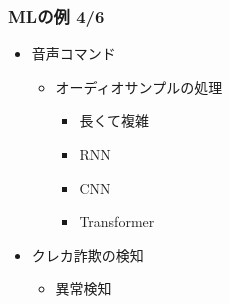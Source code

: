 \documentclass[aspectratio=169, dvipdfmx, 14pt, xcolor={svgnames,dvipsnames}]{beamer}
\def\tightlist{\itemsep1pt\parskip0pt\parsep0pt}
\begin{document}
\begin{frame}
  \frametitle{MLの例 4/6}
  \begin{itemize}
    \item
          音声コマンド

          \begin{itemize}
            \tightlist
            \item
                  オーディオサンプルの処理

                  \begin{itemize}
                    \tightlist
                    \item
                          長くて複雑

                    \item
                          RNN
                    \item
                          CNN
                    \item
                          Transformer
                  \end{itemize}
          \end{itemize}
    \item
          クレカ詐欺の検知

          \begin{itemize}
            \tightlist
            \item
                  異常検知
          \end{itemize}
  \end{itemize}

\end{frame}

\end{document}
